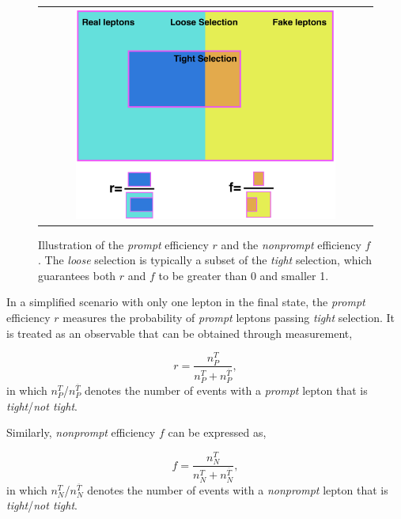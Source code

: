  \begin{figure}[tbh!]
 \begin{center}
 \begin{tabular}{c}
 \includegraphics[width=0.8\textwidth]{figures/Part3/Nonprompt/matrix}
 \end{tabular}
 \caption{Illustration of the \emph{prompt} efficiency $r$ and the \emph{nonprompt} efficiency $f$. The \emph{loose} selection is typically a subset of the \emph{tight} selection, which guarantees both $r$ and $f$ to be greater than 0 and smaller 1.}
 \label{fig:Matrix_Method}
 \end{center}
\end{figure}

In a simplified scenario with only one lepton in the final state, the \emph{prompt} efficiency $r$ measures the probability of \emph{prompt} leptons passing \emph{tight} selection. It is treated as an observable that can be obtained through measurement,

\begin{equation}
r=\frac{n_P^{T}}{n_P^{T}+n_P^{\overline{T}}},
 \label{eq:real_rate}
\end{equation}
in which $n_P^{T}$/$n_P^{\overline{T}}$ denotes the number of events with a \emph{prompt} lepton that is \emph{tight}/\emph{not tight}.

Similarly, \emph{nonprompt} efficiency $f$ can be expressed as,

\begin{equation}
f=\frac{n_{N}^{T}}{n_{N}^{T}+n_{N}^{\overline{T}}},
 \label{eq:fake_rate}
\end{equation}
in which $n_{N}^{T}$/$n_{N}^{\overline{T}}$ denotes the number of events with a \emph{nonprompt} lepton that is \emph{tight}/\emph{not tight}.

